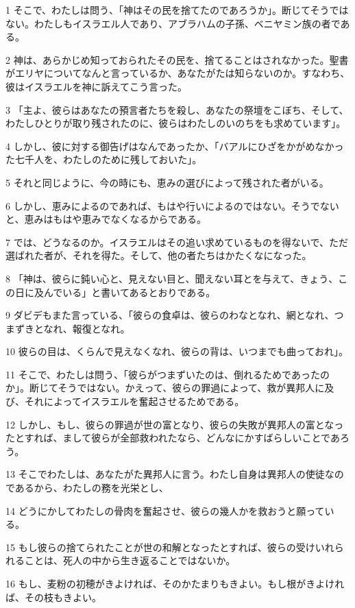 \par 1 そこで、わたしは問う、「神はその民を捨てたのであろうか」。断じてそうではない。わたしもイスラエル人であり、アブラハムの子孫、ベニヤミン族の者である。
\par 2 神は、あらかじめ知っておられたその民を、捨てることはされなかった。聖書がエリヤについてなんと言っているか、あなたがたは知らないのか。すなわち、彼はイスラエルを神に訴えてこう言った。
\par 3 「主よ、彼らはあなたの預言者たちを殺し、あなたの祭壇をこぼち、そして、わたしひとりが取り残されたのに、彼らはわたしのいのちをも求めています」。
\par 4 しかし、彼に対する御告げはなんであったか、「バアルにひざをかがめなかった七千人を、わたしのために残しておいた」。
\par 5 それと同じように、今の時にも、恵みの選びによって残された者がいる。
\par 6 しかし、恵みによるのであれば、もはや行いによるのではない。そうでないと、恵みはもはや恵みでなくなるからである。
\par 7 では、どうなるのか。イスラエルはその追い求めているものを得ないで、ただ選ばれた者が、それを得た。そして、他の者たちはかたくなになった。
\par 8 「神は、彼らに鈍い心と、見えない目と、聞えない耳とを与えて、きょう、この日に及んでいる」と書いてあるとおりである。
\par 9 ダビデもまた言っている、「彼らの食卓は、彼らのわなとなれ、網となれ、つまずきとなれ、報復となれ。
\par 10 彼らの目は、くらんで見えなくなれ、彼らの背は、いつまでも曲っておれ」。
\par 11 そこで、わたしは問う、「彼らがつまずいたのは、倒れるためであったのか」。断じてそうではない。かえって、彼らの罪過によって、救が異邦人に及び、それによってイスラエルを奮起させるためである。
\par 12 しかし、もし、彼らの罪過が世の富となり、彼らの失敗が異邦人の富となったとすれば、まして彼らが全部救われたなら、どんなにかすばらしいことであろう。
\par 13 そこでわたしは、あなたがた異邦人に言う。わたし自身は異邦人の使徒なのであるから、わたしの務を光栄とし、
\par 14 どうにかしてわたしの骨肉を奮起させ、彼らの幾人かを救おうと願っている。
\par 15 もし彼らの捨てられたことが世の和解となったとすれば、彼らの受けいれられることは、死人の中から生き返ることではないか。
\par 16 もし、麦粉の初穂がきよければ、そのかたまりもきよい。もし根がきよければ、その枝もきよい。
